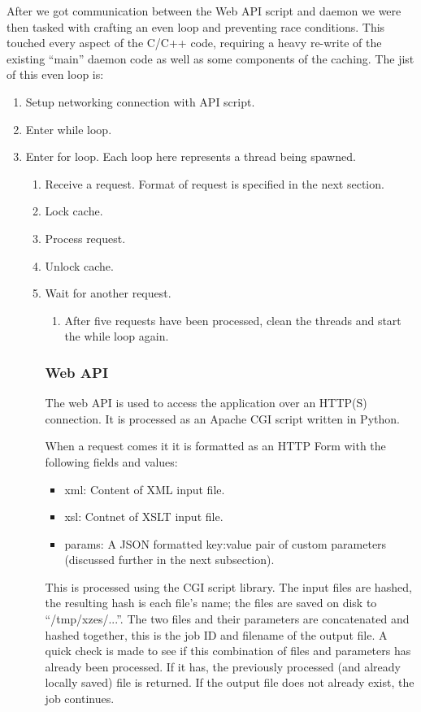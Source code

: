 After we got communication between the Web API script and daemon we were then tasked with crafting an even loop and preventing race conditions.
This touched every aspect of the C/C++ code, requiring a heavy re-write of the existing ``main'' daemon code as well as some components of the caching.
The jist of this even loop is:

\begin{enumerate}
  \item Setup networking connection with API script.
  \item Enter while loop.
  \item Enter for loop. Each loop here represents a thread being spawned.
  \begin{enumerate}
    \item Receive a request. Format of request is specified in the next section.
    \item Lock cache.
    \item Process request.
    \item Unlock cache.
    \item Wait for another request.
  \begin{enumerate}
  \item After five requests have been processed, clean the threads and start the while loop again.
\end{enumerate}

\subsubsection{Web API}

The web API is used to access the application over an HTTP(S) connection.
It is processed as an Apache CGI script written in Python.

When a request comes it it is formatted as an HTTP Form with the following fields and values:

\begin{itemize}
  \item xml: Content of XML input file.
  \item xsl: Contnet of XSLT input file.
  \item params: A JSON formatted key:value pair of custom parameters (discussed further in the next subsection).
\end{itemize}

This is processed using the CGI script library.
The input files are hashed, the resulting hash is each file's name; the files are saved on disk to ``/tmp/xzes/...''.
The two files and their parameters are concatenated and hashed together, this is the job ID and filename of the output file.
A quick check is made to see if this combination of files and parameters has already been processed.
If it has, the previously processed (and already locally saved) file is returned.
If the output file does not already exist, the job continues.


\end{enumerate}
\end{enumerate}
